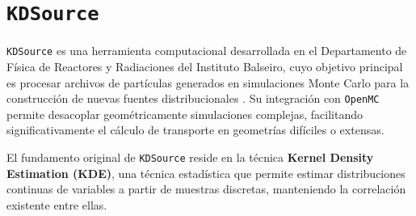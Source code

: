 \section{\texttt{KDSource}}


\texttt{KDSource} es una herramienta computacional desarrollada en el Departamento de Física de Reactores y Radiaciones del Instituto Balseiro, cuyo objetivo principal es procesar archivos de partículas generados en simulaciones Monte Carlo para la construcción de nuevas fuentes distribucionales \cite{KDSource2024}. Su integración con \texttt{OpenMC} permite desacoplar geométricamente simulaciones complejas, facilitando significativamente el cálculo de transporte en geometrías difíciles o extensas.

El fundamento original de \texttt{KDSource} reside en la técnica \textbf{Kernel Density Estimation (KDE)}, una técnica estadística que permite estimar distribuciones continuas de variables a partir de muestras discretas, manteniendo la correlación existente entre ellas. 





